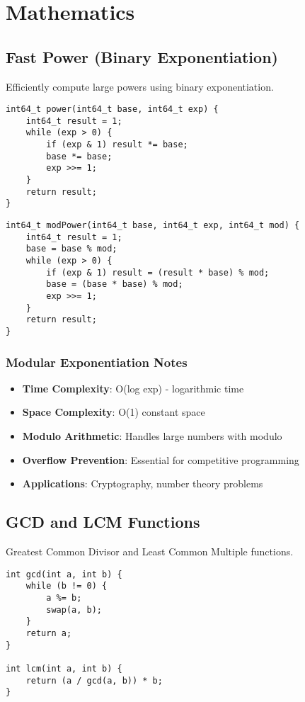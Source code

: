 \documentclass[11pt,a4paper]{article}
\begin{document}
\newpage
\section{Mathematics}

\subsection{Fast Power (Binary Exponentiation)}
Efficiently compute large powers using binary exponentiation.


\begin{lstlisting}[caption={Binary Exponentiation - Iterative}]
int64_t power(int64_t base, int64_t exp) {
    int64_t result = 1;
    while (exp > 0) {
        if (exp & 1) result *= base;
        base *= base;
        exp >>= 1;
    }
    return result;
}
\end{lstlisting}

\begin{lstlisting}[caption={Modular Exponentiation}]
int64_t modPower(int64_t base, int64_t exp, int64_t mod) {
    int64_t result = 1;
    base = base % mod;
    while (exp > 0) {
        if (exp & 1) result = (result * base) % mod;
        base = (base * base) % mod;
        exp >>= 1;
    }
    return result;
}
\end{lstlisting}

\subsubsection{Modular Exponentiation Notes}
\begin{itemize}
\item \textbf{Time Complexity}: O(log exp) - logarithmic time
\item \textbf{Space Complexity}: O(1) constant space
\item \textbf{Modulo Arithmetic}: Handles large numbers with modulo
\item \textbf{Overflow Prevention}: Essential for competitive programming
\item \textbf{Applications}: Cryptography, number theory problems
\end{itemize}

\newpage
\subsection{GCD and LCM Functions}
Greatest Common Divisor and Least Common Multiple functions.

\begin{lstlisting}[caption={GCD and LCM Functions}]
int gcd(int a, int b) {
    while (b != 0) {
        a %= b;
        swap(a, b);
    }
    return a;
}

int lcm(int a, int b) {
    return (a / gcd(a, b)) * b;
}
\end{lstlisting}
\end{document}
